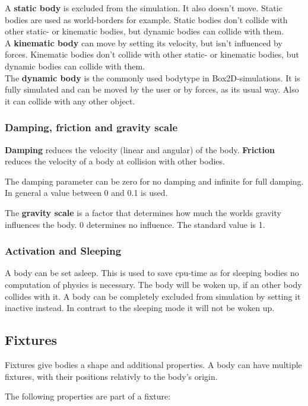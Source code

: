\documentclass[10pt,a4paper,DIV=11]{scrreprt}
\begin{document}
A \textbf{static body} is excluded from the simulation. It also doesn't move. Static bodies are used as world-borders for example. Static bodies don't collide with other static- or kinematic bodies, but dynamic bodies can collide with them. \\

A \textbf{kinematic body} can move by setting its velocity, but isn't influenced by forces.
Kinematic bodies don't collide with other static- or kinematic bodies, but dynamic bodies can collide with them.\\

The \textbf{dynamic body} is the commonly used bodytype in Box2D-simulations. It is fully simulated and can be moved by the user or by forces, as its usual way. Also it can collide with any other object.

\subsubsection*{Damping, friction and gravity scale}
\textbf{Damping} reduces the velocity (linear and angular) of the body.
\textbf{Friction} reduces the velocity of a body at collision with other bodies.

The damping parameter can be zero for no damping and infinite for full damping. In general a value between 0 and 0.1 is used.

The \textbf{gravity scale} is a factor that determines how much the worlds gravity influences the body. 0 determines no influence. The standard value is 1.

\subsubsection*{Activation and Sleeping}
A body can be set asleep. This is used to save cpu-time as for sleeping bodies no computation of physics is necessary. The body will be woken up, if an other body collides with it.
A body can be completely excluded from simulation by setting it inactive instead.
In contrast to the sleeping mode it will not be woken up.

\subsection{Fixtures}
Fixtures give bodies a shape and additional properties. A body can have multiple fixtures, with their positions relativly to the body's origin.

The following properties are part of a fixture:
\end{document}
